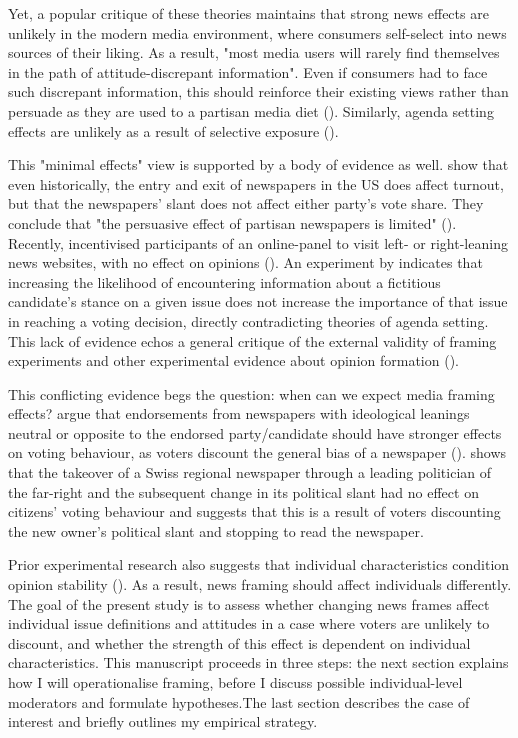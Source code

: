 \documentclass{article}
\begin{document}
Yet, a popular critique of these theories maintains that strong news effects are unlikely in the modern media environment, where consumers self-select into news sources of their liking. As a result, "most media users will rarely find themselves in the path of attitude-discrepant information". Even if consumers had to face such discrepant information, this should reinforce their existing views rather than persuade as they are used to a partisan media diet (\cite[724f]{Bennett2008}). Similarly, agenda setting effects are unlikely as a result of selective exposure (\cite{Lau2021}).

This "minimal effects" view is supported by a body of evidence as well. \citeauthor{Gentzkow2011} show that even historically, the entry and exit of newspapers in the US does affect turnout, but that the newspapers' slant does not affect either party's vote share. They conclude that "the persuasive effect of partisan newspapers is limited" (\citeyear[3011]{Gentzkow2011}). Recently, \citeauthor{Guess2021} incentivised participants of an online-panel to visit left- or right-leaning news websites, with no effect on opinions (\citeyear{Guess2021}). An experiment by \citeauthor{Lau2021} indicates that increasing the likelihood of encountering information about a fictitious candidate's stance on a given issue does not increase the importance of that issue in reaching a voting decision, directly contradicting theories of agenda setting. This lack of evidence echos a general critique of the external validity of framing experiments and other experimental evidence about opinion formation (\cite{Barabas2010, Busby2019, Leeper2020}).

This conflicting evidence begs the question: when can we expect media framing effects? \citeauthor{Chiang2011a} argue that endorsements from newspapers with ideological leanings neutral or opposite to the endorsed party/candidate should have stronger effects on voting behaviour, as voters discount the general bias of a newspaper (\citeyear{Chiang2011a}). \citeauthor{Spirig2020} shows that the takeover of a Swiss regional newspaper through a leading politician of the far-right and the subsequent change in its political slant had no effect on citizens' voting behaviour and suggests that this is a result of voters discounting the new owner's political slant and stopping to read the newspaper.

Prior experimental research also suggests that individual characteristics condition opinion stability (\cite{Converse1962, Zaller1992}). As a result, news framing should affect individuals differently. The goal of the present study is to assess whether changing news frames affect individual issue definitions and attitudes in a case where voters are unlikely to discount, and whether the strength of this effect is dependent on individual characteristics. This manuscript proceeds in three steps: the next section explains how I will operationalise framing, before I discuss possible individual-level moderators and formulate hypotheses.The last section describes the case of interest and briefly outlines my empirical strategy.
\end{document}
